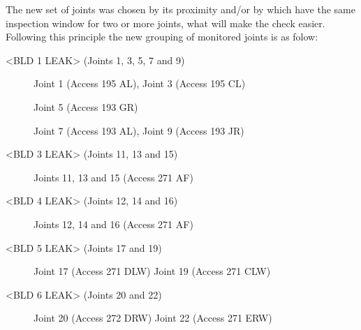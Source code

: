The new set of joints was chosen by its proximity and/or by which have the same inspection window for two or more joints, what will make the check easier.
Following this principle the new grouping of monitored joints is as folow:

<BLD 1 LEAK> (Joints 1, 3, 5, 7 and 9)

\begin{figure}[H] %
\caption{Joint 1 (Access 195 AL), Joint 3 (Access 195 CL)}
\label{fig:joint5}
\end{figure}


\begin{figure}[H] %
\caption{Joint 5 (Access 193 GR)}
\label{fig:joint1}
\end{figure}


\begin{figure}[H] %
\caption{Joint 7 (Access 193 AL), Joint 9 (Access 193 JR)}
\label{fig:joint7}
\end{figure}
<BLD 3 LEAK> (Joints 11, 13 and 15)


\begin{figure}[H] %
\caption{Joints 11, 13 and 15 (Access 271 AF)}
\label{fig:joint11}
\end{figure}
<BLD 4 LEAK> (Joints 12, 14 and 16)


\begin{figure}[H] %
\caption{Joints 12, 14 and 16 (Access 271 AF)}
\label{fig:joint12}
\end{figure}

<BLD 5 LEAK> (Joints 17 and 19)


 \begin{figure}[H] %
\caption{Joint 17 (Access 271 DLW) Joint 19 (Access 271 CLW)}
\label{fig:joint17}
\end{figure}

<BLD 6 LEAK> (Joints 20 and 22)

\begin{figure}[H] %
\caption{Joint 20 (Access 272 DRW) Joint 22 (Access 271 ERW)}
\label{fig:joint20}
\end{figure}

